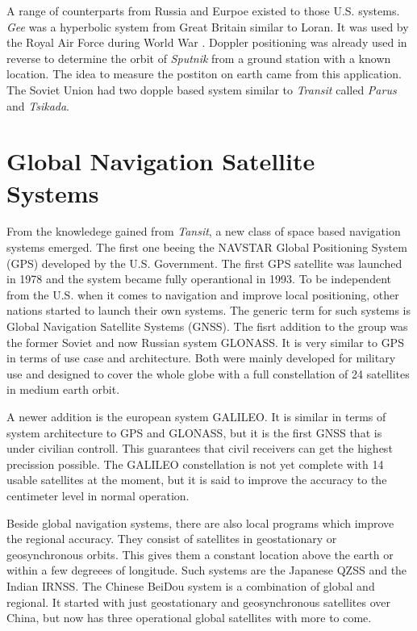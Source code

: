 A range of counterparts from Russia and Eurpoe existed to those U.S. systems.
\textit{Gee} was a hyperbolic system from Great Britain similar to Loran.
It was used by the Royal Air Force during World War .
Doppler positioning was already used in reverse to determine the orbit of \textit{Sputnik } from a ground station with a known location.
The idea to measure the postiton on earth came from this application.
The Soviet Union had two dopple based system similar to \textit{Transit} called \textit{Parus} and \textit{Tsikada}. \cite{misra2011global}


\section{Global Navigation Satellite Systems}

From the knowledege gained from \textit{Tansit}, a new class of space based navigation systems emerged. 
The first one beeing the NAVSTAR Global Positioning System (GPS) developed by the U.S. Government.
The first GPS satellite was launched in 1978 and the system became fully operantional in 1993.
To be independent from the U.S. when it comes to navigation and improve local positioning, other nations started to launch their own systems.
The generic term for such systems is Global Navigation Satellite Systems (GNSS).
The fisrt addition to the group was the former Soviet and now Russian system GLONASS.
It is very similar to GPS in terms of use case and architecture.
Both were mainly developed for military use and designed to cover the whole globe with a full constellation of 24 satellites in medium earth orbit. \cite{misra2011global}

A newer addition is the european system GALILEO.
It is similar in terms of system architecture to GPS and GLONASS, but it is the first GNSS that is under civilian controll.
This guarantees that civil receivers can get the highest precission possible.
The GALILEO constellation is not yet complete with 14 usable satellites at the moment, but it is said to improve the accuracy to the centimeter level in normal operation. \cite{GSA_Galileo}

Beside global navigation systems, there are also local programs which improve the regional accuracy.
They consist of satellites in geostationary or geosynchronous orbits.
This gives them a constant location above the earth or within a few degreees of longitude.
Such systems are the Japanese QZSS and the Indian IRNSS.
The Chinese BeiDou system is a combination of global and regional.
It started with just geostationary and geosynchronous satellites over China, but now has three operational global satellites with more to come.


